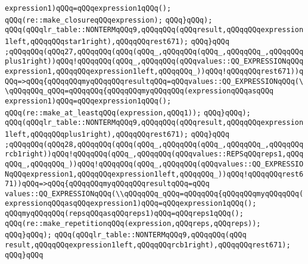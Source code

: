\verb|expression1)qQQq=qQQqexpression1qQQq();|\newline
\verb|qQQq(re::make_closureqQQqexpression);|\newline
\verb|qQQq}qQQq);|\newline
\verb|qQQq(qQQqlr_table::NONTERMqQQq9,qQQqqQQq(qQQqresult,qQQqqQQqexpression1left,qQQqqQQqstar1right),qQQqqQQqrest671);|\newline
\verb|qQQq}qQQq|\newline
\verb|;qQQqqQQq(qQQq27,qQQqqQQq(qQQq(qQQq_,qQQqqQQq(qQQq_,qQQqqQQq_,qQQqqQQqplus1right))qQQq!qQQqqQQq(qQQq_,qQQqqQQq(qQQqvalues::QQ_EXPRESSIONqQQqexpression1,qQQqqQQqexpression1left,qQQqqQQq_))qQQq!qQQqqQQqrest671))qQQq=>qQQq{qQQqqQQqmyqQQqqQQqresultqQQq=qQQqvalues::QQ_EXPRESSIONqQQq(\\qQQqqQQq_qQQq=qQQqqQQq{qQQqqQQqmyqQQqqQQq(expressionqQQqasqQQq|\newline
\verb|expression1)qQQq=qQQqexpression1qQQq();|\newline
\verb|qQQq(re::make_at_leastqQQq(expression,qQQq1));|\newline
\verb|qQQq}qQQq);|\newline
\verb|qQQq(qQQqlr_table::NONTERMqQQq9,qQQqqQQq(qQQqresult,qQQqqQQqexpression1left,qQQqqQQqplus1right),qQQqqQQqrest671);|\newline
\verb|qQQq}qQQq|\newline
\verb|;qQQqqQQq(qQQq28,qQQqqQQq(qQQq(qQQq_,qQQqqQQq(qQQq_,qQQqqQQq_,qQQqqQQqrcb1right))qQQq!qQQqqQQq(qQQq_,qQQqqQQq(qQQqvalues::REPSqQQqreps1,qQQqqQQq_,qQQqqQQq_))qQQq!qQQqqQQq(qQQq_,qQQqqQQq(qQQqvalues::QQ_EXPRESSIONqQQqexpression1,qQQqqQQqexpression1left,qQQqqQQq_))qQQq!qQQqqQQqrest671))qQQq=>qQQq{qQQqqQQqmyqQQqqQQqresultqQQq=qQQq|\newline
\verb|values::QQ_EXPRESSIONqQQq(\\qQQqqQQq_qQQq=qQQqqQQq{qQQqqQQqmyqQQqqQQq(expressionqQQqasqQQqexpression1)qQQq=qQQqexpression1qQQq();|\newline
\verb|qQQqmyqQQqqQQq(repsqQQqasqQQqreps1)qQQq=qQQqreps1qQQq();|\newline
\verb|qQQq(re::make_repetitionqQQq(expression,qQQqreps,qQQqreps));|\newline
\verb|qQQq}qQQq);|\newline
\verb|qQQq(qQQqlr_table::NONTERMqQQq9,qQQqqQQq(qQQq|\newline
\verb|result,qQQqqQQqexpression1left,qQQqqQQqrcb1right),qQQqqQQqrest671);|\newline
\verb|qQQq}qQQq|\newline
